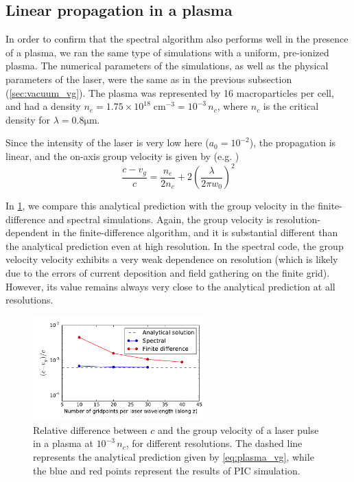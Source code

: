 \documentclass[1p,times,authoryear]{elsarticle}
\begin{document}
\subsection{Linear propagation in a plasma}
\label{sec:linear_plasma}

In order to confirm that the spectral algorithm also performs well in
the presence of a plasma, we ran the same type of simulations with a
uniform, pre-ionized plasma. The numerical parameters of the
simulations, as well as the physical parameters of the laser, 
were the same as in the previous subsection
(\cref{sec:vacuum_vg}). The plasma was represented by 16
macroparticles per cell, and had a density $n_e = 1.75\times
10^{18}\;\mathrm{cm}^{-3} = 10^{-3}\,n_c$, where $n_c$ is the critical
density for $\lambda=0.8\mathrm{\mu m}$.

Since the intensity of the laser is very low here ($a_0 = 10^{-2}$),
the propagation is linear, and the on-axis group velocity is given by
(e.g. \citep{Esarey1999})
\begin{equation} 
\label{eq:plasma_vg}
\frac{c-v_g}{c} = \frac{n_e}{2n_c} + 2\left( \frac{\lambda}{2\pi w_0} \right)^2
\end{equation}

In \cref{fig:Plasma_vg}, we compare this analytical prediction with the group velocity in the
finite-difference and spectral simulations. Again, the
group velocity is resolution-dependent in the finite-difference
algorithm, and it is substantial different than the analytical
prediction even at high resolution. In the spectral code, the group
velocity velocity exhibits a very weak dependence on resolution
(which is likely due to the errors of current deposition and field
gathering on the finite grid). However, its value remains always very
close to the analytical prediction at all resolutions.

\begin{figure}[!h]
\centering
\includegraphics[width=0.6\textwidth]{figures/Plasma_vg.pdf}
\caption{\label{fig:Plasma_vg}Relative difference between $c$ and the
group velocity of a laser pulse in a plasma at $10^{-3}\,n_c$, for different
resolutions. The dashed line represents
the analytical prediction given by \cref{eq:plasma_vg}, while the blue
and red points represent the results of PIC simulation.}
\end{figure}
\end{document}
